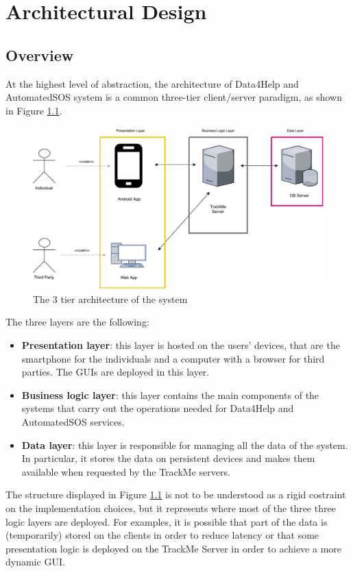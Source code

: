\chapter{Architectural Design}\label{c:arch}

\section{Overview}

At the highest level of abstraction, the architecture of Data4Help and AutomatedSOS system is a common three-tier client/server paradigm, as shown in Figure \ref{f:3tier}.





\begin{figure}[H]
\centering
\includegraphics[scale=0.65]{resources/overview}
\caption{The 3 tier architecture of the system}\label{f:3tier}
\end{figure}
\noindent
The three layers are the following:

\begin{itemize}
\item \textbf{Presentation layer}: this layer is hosted on the users' devices, that are the smartphone for the individuals and a computer with a browser for third parties.
The GUIs are deployed in this layer.
\item \textbf{Business logic layer}: this layer contains the main components of the systems that carry out the operations needed for Data4Help and AutomatedSOS services.
\item \textbf{Data layer}: this layer is responsible for managing all the data of the system. 
In particular, it stores the data on persistent devices and makes them available when requested by the TrackMe servers.
\end{itemize}
The structure displayed in Figure \ref{f:3tier} is not to be understood as a rigid costraint on the implementation choices, but it represents where most of the three three logic layers are deployed.
For examples, it is possible that part of the data is (temporarily) stored on the clients in order to reduce latency or that some presentation logic is deployed on the TrackMe Server in order to achieve a more dynamic GUI.





